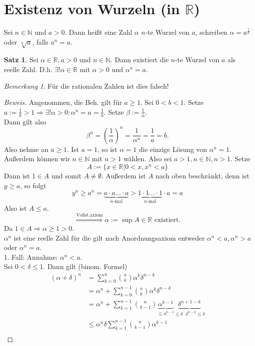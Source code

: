 \documentclass[12pt,a4paper,titlepage]{article} %
\theoremstyle{definition}
\newtheorem{satz}{Satz}[subsection]
\theoremstyle{remark}
\newtheorem*{bem}{Bemerkung}
\newenvironment{bew}{\begin{proof}[Beweis]}{\end{proof}}
\newcommand{\N}{\mathbb{N}}
\newcommand{\R}{\mathbb{R}}
\begin{document}
\section{Existenz von Wurzeln (in $\R$)}
Sei $n\in\N$ und $a>0$. Dann heißt eine Zahl $\alpha$ $n$-te Wurzel von $a$, schreiben $\alpha = a^{\frac{1}{n}}$ oder $\sqrt[n]{a}$, falls $a^n = a$.
\begin{satz}
	Sei $\alpha \in\R, a>0$ und $n\in\N$. Dann existiert die $n$-te Wurzel von $a$ als reelle Zahl. D.h. $\exists ! \alpha\in\R$ mit $\alpha>0$ und $\alpha^n = a$.
\end{satz}
\begin{bem}
	Für die rationalen Zahlen ist dies falsch!
\end{bem}
\begin{bew}
	Angenommen, die Beh. gilt für $a\geq 1$. Sei $0<b<1$. Setze $a :=\frac{1}{b}>1\Rightarrow \exists !\alpha>0:\alpha^n = a = \frac{1}{b}$. Setze $\beta := \frac{1}{\alpha}$.\\
	Dann gilt also $$\beta^n = \left(\frac{1}{\alpha}\right)^n = \frac{1}{\alpha^n} = \frac{1}{a} = b.$$
	Also nehme an $a\geq 1$. Ist $a=1$, so ist $\alpha = 1$ die einzige Lösung von $\alpha^n = 1$. Außerdem können wir $n\in\N$ mit $n>1$ wählen. Also sei $a>1,n\in\N,n>1$. Setze 
	$$A := \{x\in\R|0<x, x^n<a\}$$
	Dann ist $1\in A$ und somit $A\neq\emptyset$. Außerdem ist $A$ nach oben beschränkt, denn ist $y \geq a$, so folgt 
	$$y^n \geq a^n = \underbrace{a \cdot a \ldots \cdot a}_{n\text{-mal}} > \underbrace{1 \cdot 1 \ldots \cdot 1}_{n\text{-mal}} \cdot a = a$$
	Also ist $A \leq a$.
	$$\overset{\text{Vollst.axiom}}{\Rightarrow} \alpha := \sup A \in\R \text{ existiert}.$$
	Da $1\in A \Rightarrow \alpha \geq 1 > 0$.\\
	$\alpha^n$ ist eine reelle Zahl für die gilt nach Anordnungsaxiom entweder $\alpha^n <a, \alpha^n >a$ oder $\alpha^n = a$.\\
	1. Fall: Annahme: $\alpha^n <a$.\\
	Sei $0<\delta\leq 1$. Dann gilt (binom. Formel)
	\begin{align*}
		(\alpha + \delta)^n &= \sum_{k=0}^{n} \binom{n}{k} \alpha^k\delta^{n-k}\\
		&= \alpha^n + \sum_{k=0}^{n-1} \binom{n}{k} \alpha^k\delta^{n-k}\\
		&= \alpha^n + \sum_{k=1}^{n-1} \binom{n}{k-1} \underbrace{\alpha^{k-1}}_{\leq a^{k-1}}\underbrace{\delta^{n+1-k}}_{\leq \delta \cdot \delta^{n-k} \leq \delta}\\
		&\leq \alpha^n \delta \sum_{k=1}^{n-1} \binom{n}{k-1} \alpha^{k-1}\\

\end{align*}
\end{bew}
\end{document}
